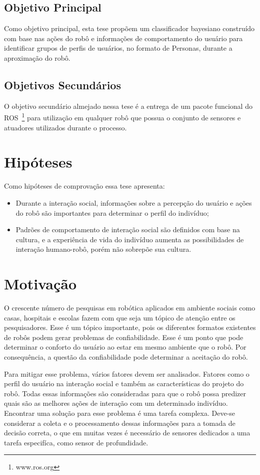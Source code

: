 \subsection{Objetivo Principal}
Como objetivo principal, esta tese propõem um classificador bayesiano construído com base nas ações do robô e informações de comportamento do usuário para identificar grupos de perfis de usuários, no formato de Personas, durante a aproximação do robô.

\subsection{Objetivos Secundários}
O objetivo secundário almejado nessa tese é a entrega de um pacote funcional do ROS~\footnote{www.ros.org} para utilização em qualquer robô que possua o conjunto de sensores e atuadores utilizados durante o processo.

\section{Hipóteses}
Como hipóteses de comprovação essa tese apresenta:

\begin{itemize}
    \item Durante a interação social, informações sobre a percepção do usuário e ações do robô são importantes para determinar o perfil do indivíduo;
    \item Padrões de comportamento de interação social são definidos com base na cultura, e a experiência de vida do indivíduo aumenta as possibilidades de interação humano-robô, porém não sobrepõe sua cultura.
\end{itemize}

\section{Motivação}
O crescente número de pesquisas em robótica aplicados em ambiente sociais como casas, hospitais e escolas fazem com que seja um tópico de atenção entre os pesquisadores. Esse é um tópico importante, pois os diferentes formatos existentes de robôs podem gerar problemas de confiabilidade. Esse é um ponto que pode determinar o conforto do usuário ao estar em mesmo ambiente que o robô. Por consequência, a questão da confiabilidade pode determinar a aceitação do robô.

Para mitigar esse problema, vários fatores devem ser analisados. Fatores como o perfil do usuário na interação social e também as características do projeto do robô. Todas essas informações são consideradas para que o robô possa predizer quais são as melhores ações de interação com um determinado indivíduo. Encontrar uma solução  para esse problema é uma tarefa complexa. Deve-se considerar a coleta e o processamento dessas informações para a tomada de decisão correta, o que em muitas vezes é necessário de sensores dedicados a uma tarefa especifíca, como sensor de profundidade.

